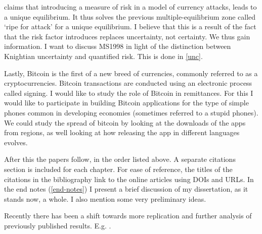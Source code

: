 \documentclass[a4paper]{report}
\begin{document}
\begin{refsection}

\textcite{morris1998unique} claims that introducing a measure of risk in a model of currency attacks, leads to a unique equilibrium.
It thus solves the previous multiple-equilibrium zone called `ripe for attack' for a unique equilibrium.
I believe that this is a result of the fact that the risk factor introduces replaces uncertainty, not certainty.
We thus gain information.
I want to discuss MS1998 in light of the distinction between Knightian uncertainty and quantified risk.
This is done in \autoref{unc}.

Lastly, Bitcoin is the first of a new breed of currencies, commonly referred to as a cryptocurrencies. 
Bitcoin transactions are conducted using an electronic process called signing.
I would like to study the role of Bitcoin in remittances.
For this I would like to participate in building Bitcoin applications for the type of simple phones common in developing economies (sometimes referred to a stupid phones).
We could study the spread of bitcoin by looking at the downloads of the apps from regions,
as well looking at how releasing the app in different languages evolves.

After this the papers follow, in the order listed above.
A separate citations section is included for each chapter.
For ease of reference, the titles of the citations in the bibliography link to the online articles using DOIs and URLs.
In the end notes (\autoref{end-notes}) I present a brief discussion of my dissertation, as it stands now, a whole.
I also mention some very preliminary ideas.

Recently there has been a shift towards more replication and further analysis of previously published results. E.g. \textcite{ioannidis2005most}.

\printbibliography
\end{refsection}
\end{document}
